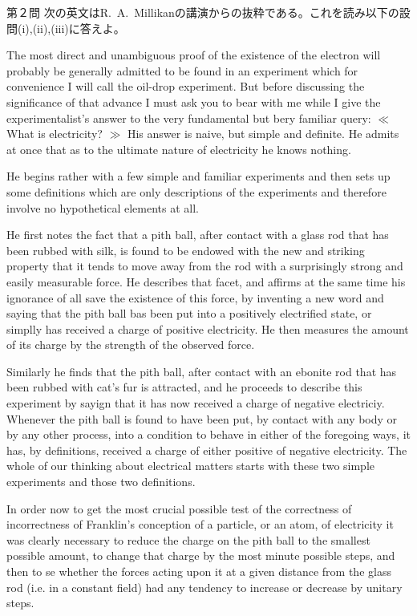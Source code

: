 \documentclass[fleqn]{jbook}
\begin{document}
\begin{question}{第２問}{}
次の英文はR.~A.~Millikanの講演からの抜粋である。これを読み以下の設問(i),(ii),(iii)に答えよ。

\bigskip

\qquad The most direct and unambiguous proof of the existence of the electron will probably be generally admitted to be found in an experiment which for convenience I will call the oil-drop experiment. But before discussing the significance of that advance I must ask you to bear with me while I give the experimentalist's answer to the very fundamental but bery familiar query: $\ll$ What is electricity? $\gg$ His answer is naive, but simple and definite. He admits at once that as to the ultimate nature of electricity he knows nothing.

\qquad He begins rather with a few simple and familiar experiments and then sets up some definitions which are only descriptions of the experiments and therefore involve no hypothetical elements at all.

\qquad He first notes the fact that a pith ball, after contact with a glass rod that has been rubbed with silk, is found to be endowed with the new and striking property that it tends to move away from the rod with a surprisingly strong and easily measurable force. He describes that facet, and affirms at the same time his ignorance of all save the existence of this force, by inventing a new word and saying that the pith ball bas been put into a positively electrified state, or simplly has received a charge of positive electricity. He then measures the amount of its charge by the strength of the observed force.

\qquad Similarly he finds that the pith ball, after contact with an ebonite rod that has been rubbed with cat's fur is attracted, and he proceeds to describe this experiment by sayign that it has now received a charge of negative electriciy. Whenever the pith ball is found to have been put, by contact with any body or by any other process, into a condition to behave in either of the foregoing ways, it has, by definitions, received a charge of either positive of negative electricity. The whole of our thinking about electrical matters starts with these two simple experiments and those two definitions.

\qquad In order now to get the most crucial possible test of the correctness of incorrectness of Franklin's conception of a particle, or an atom, of electricity it was clearly necessary to reduce the charge on the pith ball to the smallest possible amount, to change that charge by the most minute possible steps, and then to se whether the forces acting upon it at a given distance from the glass rod (i.e. in a constant field) had any tendency to increase or decrease by unitary steps.


\end{question}
\end{document}
